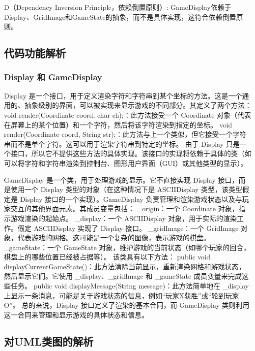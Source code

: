 D（Dependency Inversion Principle，依赖倒置原则）:
GameDisplay依赖于Display、GridImage和GameState的抽象，而不是具体实现，这符合依赖倒置原则。

\subsection{代码功能解析}

\subsubsection{Display 和 GameDisplay}

Display 是一个接口，用于定义渲染字符和字符串到某个坐标的方法。这是一个通用的、抽象级别的界面，可以被实现来显示游戏的不同部分。其定义了两个方法：
void render(Coordinate coord, char ch);：此方法接受一个 Coordinate 对象（代表在屏幕上的某个位置）和一个字符，然后将该字符渲染到指定的坐标。
void render(Coordinate coord, String str);：此方法与上一个类似，但它接受一个字符串而不是单个字符。这可以用于渲染字符串到特定的坐标。
由于 Display 只是一个接口，所以它不提供这些方法的具体实现。该接口的实现将依赖于具体的类（如可以将字符和字符串渲染到控制台、图形用户界面（GUI）或其他类型的显示）。

GameDisplay 是一个类，用于处理游戏的显示。它不直接实现 Display 接口，而是使用一个 Display 类型的对象（在这种情况下是 ASCIIDisplay 类型，该类型假定是 Display 接口的一个实现）。GameDisplay 负责管理和渲染游戏状态以及与玩家交互的其他界面元素。其成员变量包括：
\_origin：一个 Coordinate 对象，指示游戏渲染的起始点。
\_display：一个 ASCIIDisplay 对象，用于实际的渲染工作。假定 ASCIIDisplay 实现了 Display 接口。
\_gridImage：一个 GridImage 对象，代表游戏的网格。这可能是一个复杂的图像，表示游戏的棋盘。
\_gameState：一个 GameState 对象，维护游戏的当前状态（如哪个玩家的回合，棋盘上的哪些位置已经被占据等）。
该类具有以下方法：
public void displayCurrentGameState()：此方法清除当前显示，重新渲染网格和游戏状态，然后显示它们。它使用 \_display、\_gridImage 和 \_gameState 成员变量来完成这些任务。
public void displayMessage(String message)：此方法简单地在 \_display 上显示一条消息，可能是关于游戏状态的信息，例如“玩家X获胜”或“轮到玩家O”。
总的来说，Display 接口定义了渲染的基本合同，而 GameDisplay 类则利用这一合同来管理和显示游戏的具体状态和信息。

\subsection{对UML类图的解析}






